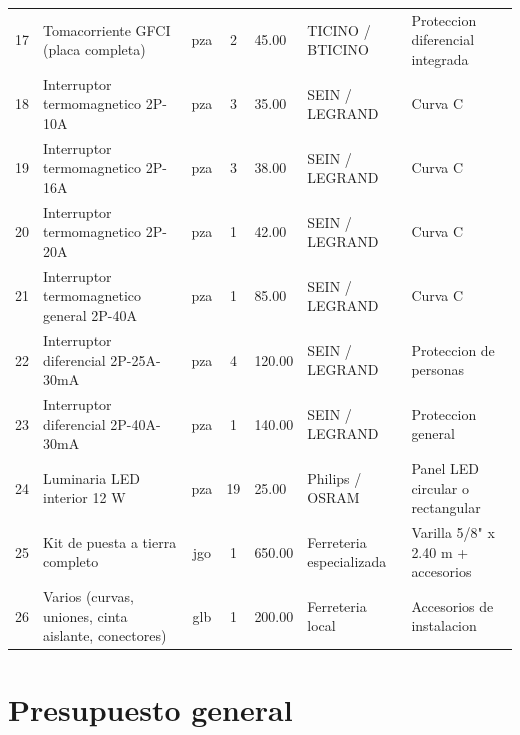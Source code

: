\begin{table}[H]
\begin{tabularx}{\textwidth}{c Y c c R{1.8cm} L{2.0cm} L{2.5cm}}
17 & Tomacorriente GFCI (placa completa) & pza & 2 & 45.00 & TICINO / BTICINO & Proteccion diferencial integrada \\
18 & Interruptor termomagnetico 2P-10A & pza & 3 & 35.00 & SEIN / LEGRAND & Curva C \\
19 & Interruptor termomagnetico 2P-16A & pza & 3 & 38.00 & SEIN / LEGRAND & Curva C \\
20 & Interruptor termomagnetico 2P-20A & pza & 1 & 42.00 & SEIN / LEGRAND & Curva C \\
21 & Interruptor termomagnetico general 2P-40A & pza & 1 & 85.00 & SEIN / LEGRAND & Curva C \\
22 & Interruptor diferencial 2P-25A-30mA & pza & 4 & 120.00 & SEIN / LEGRAND & Proteccion de personas \\
23 & Interruptor diferencial 2P-40A-30mA & pza & 1 & 140.00 & SEIN / LEGRAND & Proteccion general \\
24 & Luminaria LED interior 12 W & pza & 19 & 25.00 & Philips / OSRAM & Panel LED circular o rectangular \\
25 & Kit de puesta a tierra completo & jgo & 1 & 650.00 & Ferreteria especializada & Varilla 5/8" x 2.40 m + accesorios \\
26 & Varios (curvas, uniones, cinta aislante, conectores) & glb & 1 & 200.00 & Ferreteria local & Accesorios de instalacion \\
\bottomrule
\end{tabularx}
\end{table}

\clearpage

\section{Presupuesto general}

